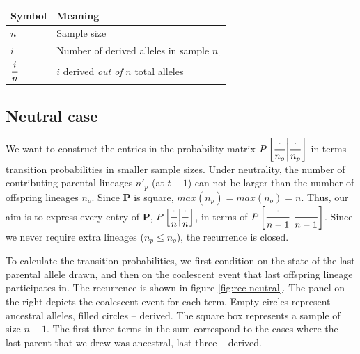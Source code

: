 \documentclass[review]{elsarticle}
\newcommand{\Dfrac}[2]{%
  \ooalign{%
    $\genfrac{}{}{1.2pt}0{#1}{#2}$\cr%
    $\color{white}\genfrac{}{}{.4pt}0{\phantom{#1}}{\phantom{#2}}$}%
}
\newcommand{\cond}{\middle\vert}
\begin{document}
\begin{center}
\begin{tabular}{ll}
Symbol & Meaning\\
\hline
$n$ & Sample size\\
$i$ & Number of derived alleles in sample $n_{\cdot}$\\
$\Dfrac{i}{n}$ & $i$ derived \emph{out of} $n$ total alleles\\
\end{tabular}
\end{center}

\subsection{Neutral case}

We want to construct the entries in the probability matrix
$P\left[ \Dfrac{\cdot}{n_o} \cond \Dfrac{\cdot}{n_p} \right]$ in terms transition probabilities in
smaller sample sizes. Under neutrality, the number of contributing parental lineages $n'_p$ (at
$t-1$) can not be larger than the number of offspring lineages $n_o$. Since $\mathbf{P}$ is square,
$max(n_p)=max(n_o)=n$. Thus, our aim is to express every entry of $\mathbf{P}$,
$P\left[ \Dfrac{\cdot}{n} \cond\Dfrac{\cdot}{n} \right]$, in terms of
$P\left[ \Dfrac{\cdot}{n-1} \cond \Dfrac{\cdot}{n-1} \right]$. Since we never require extra lineages
($n_p\le n_o$), the recurrence is closed.

To calculate the transition probabilities, we first condition on the state of the last parental
allele drawn, and then on the coalescent event that last offspring lineage participates in. The
recurrence is shown in figure \ref{fig:rec-neutral}. The panel on the right depicts the coalescent
event for each term. Empty circles represent ancestral alleles, filled circles -- derived. The
square box represents a sample of size $n-1$. The first three terms in the sum correspond to the
cases where the last parent that we drew was ancestral, last three -- derived.
\end{document}
